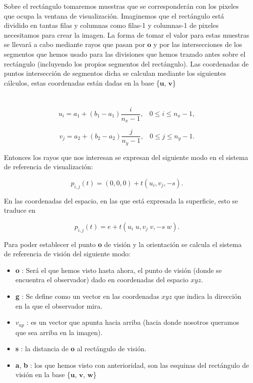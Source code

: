 Sobre el rectángulo tomaremos muestras que se corresponderán con los pixeles que ocupa la ventana de visualización. Imaginemos que el rectángulo está dividido en tantas filas y columnas como filas-1 y columnas-1 de pixeles necesitamos para crear la imagen. La forma de tomar el valor para estas muestras se llevará a cabo mediante rayos que pasan por $\textbf{o}$ y por las intersecciones de los segmentos que hemos usado para las divisiones que hemos trazado antes sobre el rectángulo (incluyendo los propios segmentos del rectángulo). Las coordenadas de puntos intersección de segmentos dicha se calculan mediante los siguientes cálculos, estas coordenadas están dadas en la base \{$\textbf{u}$, $\textbf{v}$\}
	${ }$\\
	${ }$\\
	${ }$\\


\[
	u_i = a_1 + (b_1-a_1) \frac{i}{n_x-1}, \;\;\; 0 \leq i \leq n_x -1,
\]

\[
	v_j = a_2 + (b_2-a_2) \frac{j}{n_y-1}, \;\;\; 0 \leq j \leq n_y -1.
\]

Entonces los rayos que nos interesan se expresan del siguiente modo en el sistema de referencia de visualización:

\[
	p_{i,j}(t) = (0,0,0) + t(u_i , v_j, -s).
\]

En las coordenadas del espacio, en las que está expresada la superficie, esto se traduce en 

\[
	p_{i,j}(t) = e + t( u_i \; u, v_j \; v, -s \; w).
\]

Para poder establecer el punto \textbf{o} de visión y la orientación se calcula el sistema de referencia de visión del siguiente modo:
\begin{itemize}
	\item \textbf{o} : Será el que hemos visto hasta ahora, el punto de visión (donde se encuentra el observador) dado en coordenadas del espacio $xyz$.
	\item \textbf{g} : Se define como un vector en las coordenadas $xyz$ que indica la dirección en la que el observador mira.
	\item \textbf{$v_{up}$} : es un vector que apunta hacia arriba (hacia donde nosotros queramos que sea arriba en la imagen).
	\item \textbf{s} : la distancia de \textbf{o} al rectángulo de visión.
	\item \textbf{a}, \textbf{b} : los que hemos visto con anterioridad, son las esquinas del rectángulo de visión en la base \{$\textbf{u}$, $\textbf{v}$, $\textbf{w}$\}
\end{itemize}

